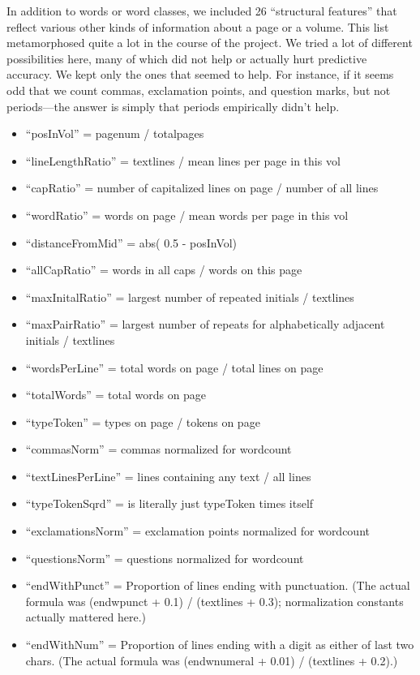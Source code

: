 \documentclass[paper=a4, fontsize=12pt]{scrartcl}
\numberwithin{equation}{section}		%
\numberwithin{figure}{section}			%
\numberwithin{table}{section}				%
\begin{document}
In addition to words or word classes, we included 26 ``structural features'' that reflect various other kinds of information about a page or a volume. This list metamorphosed quite a lot in the course of the project. We tried a lot of different possibilities here, many of which did not help or actually hurt predictive accuracy. We kept only the ones that seemed to help. For instance, if it seems odd that we count commas, exclamation points, and question marks, but not periods---the answer is simply that periods empirically didn't help.

\begin{itemize}
\item ``posInVol'' = pagenum / totalpages
\item  ``lineLengthRatio'' = textlines / mean lines per page in this vol
\item  ``capRatio'' = number of capitalized lines on page / number of all lines
\item  ``wordRatio'' = words on page / mean words per page in this vol
\item  ``distanceFromMid'' = abs( 0.5 - posInVol)
\item  ``allCapRatio'' = words in all caps / words on this page
\item  ``maxInitalRatio'' = largest number of repeated initials / textlines
\item  ``maxPairRatio'' = largest number of repeats for alphabetically adjacent initials / textlines
\item  ``wordsPerLine'' = total words on page / total lines on page
\item  ``totalWords'' = total words on page
\item  ``typeToken'' = types on page / tokens on page
\item  ``commasNorm'' = commas normalized for wordcount
\item  ``textLinesPerLine'' = lines containing any text / all lines
\item  ``typeTokenSqrd'' = is literally just typeToken times itself
\item  ``exclamationsNorm'' = exclamation points normalized for wordcount
\item  ``questionsNorm'' = questions normalized for wordcount
\item  ``endWithPunct'' = Proportion of lines ending with punctuation. (The actual formula was (endwpunct + 0.1) / (textlines + 0.3); normalization constants actually mattered here.)
\item  ``endWithNum'' = Proportion of lines ending with a digit as either of last two chars. (The actual formula was (endwnumeral + 0.01) / (textlines + 0.2).)

\end{itemize}
\end{document}
